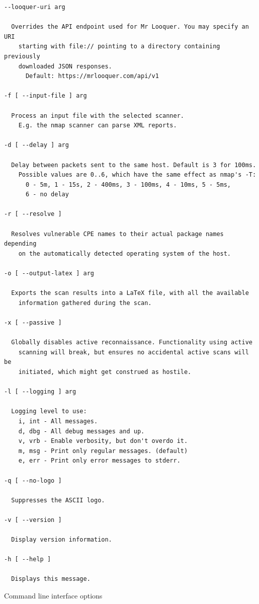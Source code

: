 \documentclass[a4paper,12pt]{article}
\begin{document}
\begin{verbatim}
--looquer-uri arg

  Overrides the API endpoint used for Mr Looquer. You may specify an URI
    starting with file:// pointing to a directory containing previously
    downloaded JSON responses.
      Default: https://mrlooquer.com/api/v1

-f [ --input-file ] arg

  Process an input file with the selected scanner.
    E.g. the nmap scanner can parse XML reports.

-d [ --delay ] arg

  Delay between packets sent to the same host. Default is 3 for 100ms.
    Possible values are 0..6, which have the same effect as nmap's -T:
      0 - 5m, 1 - 15s, 2 - 400ms, 3 - 100ms, 4 - 10ms, 5 - 5ms,
      6 - no delay

-r [ --resolve ]

  Resolves vulnerable CPE names to their actual package names depending
    on the automatically detected operating system of the host.

-o [ --output-latex ] arg

  Exports the scan results into a LaTeX file, with all the available
    information gathered during the scan.

-x [ --passive ]

  Globally disables active reconnaissance. Functionality using active
    scanning will break, but ensures no accidental active scans will be
    initiated, which might get construed as hostile.

-l [ --logging ] arg

  Logging level to use:
    i, int - All messages.
    d, dbg - All debug messages and up.
    v, vrb - Enable verbosity, but don't overdo it.
    m, msg - Print only regular messages. (default)
    e, err - Print only error messages to stderr.

-q [ --no-logo ]

  Suppresses the ASCII logo.

-v [ --version ]

  Display version information.

-h [ --help ]

  Displays this message.
	\end{verbatim}
	\vspace{-0.3in}
	\begin{listing}[H]
		\caption{Command line interface options}
		\label{clihelp}
	\end{listing}
\end{document}
